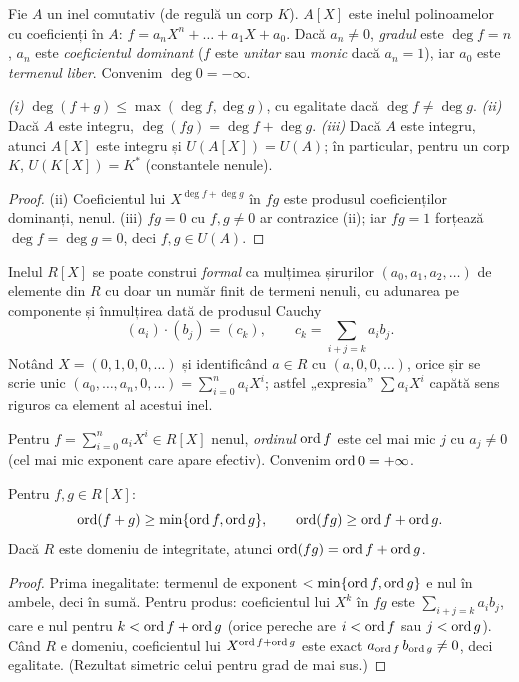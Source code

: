Fie $A$ un inel comutativ (de regulă un corp $K$). $A[X]$ este inelul polinoamelor cu coeficienți în $A$: $f=a_nX^n+\dots+a_1X+a_0$. Dacă $a_n\neq0$, \emph{gradul} este $\deg f=n$, $a_n$ este \emph{coeficientul dominant} ($f$ este \emph{unitar} sau \emph{monic} dacă $a_n=1$), iar $a_0$ este \emph{termenul liber}. Convenim $\deg 0=-\infty$.

\begin{propozitie}[gradele]\label{prop:grade}
\emph{(i)} $\deg(f+g)\le\max(\deg f,\deg g)$, cu egalitate dacă $\deg f\neq\deg g$. \emph{(ii)} Dacă $A$ este integru, $\deg(fg)=\deg f+\deg g$. \emph{(iii)} Dacă $A$ este integru, atunci $A[X]$ este integru și $U(A[X])=U(A)$; în particular, pentru un corp $K$, $U(K[X])=K^*$ (constantele nenule).
\end{propozitie}

\begin{proof}
(ii) Coeficientul lui $X^{\deg f+\deg g}$ în $fg$ este produsul coeficienților dominanți, nenul. (iii) $fg=0$ cu $f,g\neq0$ ar contrazice (ii); iar $fg=1$ forțează $\deg f=\deg g=0$, deci $f,g\in U(A)$.
\end{proof}

\begin{observatie}
Inelul $R[X]$ se poate construi \emph{formal} ca mulțimea șirurilor $(a_0,a_1,a_2,\dots)$ de elemente din $R$ cu doar un număr finit de termeni nenuli, cu adunarea pe componente și înmulțirea dată de produsul Cauchy
\[
(a_i)\cdot(b_j)=(c_k),\qquad c_k=\sum_{i+j=k}a_ib_j.
\]
Notând $X=(0,1,0,0,\dots)$ și identificând $a\in R$ cu $(a,0,0,\dots)$, orice șir se scrie unic $(a_0,\dots,a_n,0,\dots)=\sum_{i=0}^n a_iX^i$; astfel „expresia'' $\sum a_iX^i$ capătă sens riguros ca element al acestui inel.
\end{observatie}

\begin{definitie}
Pentru $f=\sum_{i=0}^n a_iX^i\in R[X]$ nenul, \emph{ordinul} $\operatorname{ord} f$ este cel mai mic $j$ cu $a_j\neq0$ (cel mai mic exponent care apare efectiv). Convenim $\operatorname{ord} 0=+\infty$.
\end{definitie}

\begin{propozitie}\label{prop:ordinpol}
Pentru $f,g\in R[X]$:
\[
\operatorname{ord}(f+g)\ge\min\{\operatorname{ord} f,\operatorname{ord} g\},\qquad \operatorname{ord}(fg)\ge\operatorname{ord} f+\operatorname{ord} g.
\]
Dacă $R$ este domeniu de integritate, atunci $\operatorname{ord}(fg)=\operatorname{ord} f+\operatorname{ord} g$.
\end{propozitie}
\begin{proof}
Prima inegalitate: termenul de exponent $<\min\{\operatorname{ord} f,\operatorname{ord} g\}$ e nul în ambele, deci în sumă. Pentru produs: coeficientul lui $X^k$ în $fg$ este $\sum_{i+j=k}a_ib_j$, care e nul pentru $k<\operatorname{ord} f+\operatorname{ord} g$ (orice pereche are $i<\operatorname{ord} f$ sau $j<\operatorname{ord} g$). Când $R$ e domeniu, coeficientul lui $X^{\operatorname{ord} f+\operatorname{ord} g}$ este exact $a_{\operatorname{ord} f}\,b_{\operatorname{ord} g}\neq0$, deci egalitate. (Rezultat simetric celui pentru grad de mai sus.)
\end{proof}

